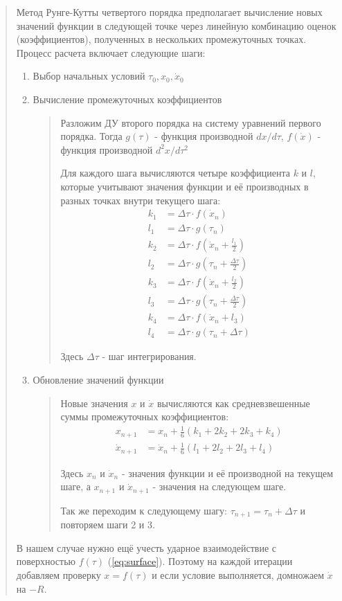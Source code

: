 \begin{quotation}
Метод Рунге-Кутты четвертого порядка предполагает вычисление новых значений функции в следующей точке через линейную комбинацию оценок (коэффициентов), полученных в нескольких промежуточных точках. Процесс расчета включает следующие шаги:

\begin{enumerate}
\item \label{initial_conditions}Выбор начальных условий $\tau_0, x_0, \dot x_0$
\item \label{intermediate_coefficients}Вычисление промежуточных коэффициентов
\begin{quotation}
Разложим ДУ второго порядка на систему уравнений первого порядка. Тогда $g(\tau)$ - функция производной $dx/d\tau$, \quad $f(\dot x)$ - функция производной $d^2x/d\tau^2$

Для каждого шага вычисляются четыре коэффициента \( k \) и \( l \), которые учитывают значения функции и её производных в разных точках внутри текущего шага:
\begin{align*}
k_1 &= \Delta \tau \cdot f(\dot x_n) \\
l_1 &= \Delta \tau \cdot g(\tau_n) \\
k_2 &= \Delta \tau \cdot f(\dot x_n + \frac{l_1}{2}) \\
l_2 &= \Delta \tau \cdot g(\tau_n + \frac{\Delta \tau }{2}) \\
k_3 &= \Delta \tau \cdot f(\dot x_n + \frac{l_2}{2}) \\
l_3 &= \Delta \tau \cdot g(\tau_n + \frac{\Delta \tau }{2}) \\
k_4 &= \Delta \tau \cdot f(\dot x_n + l_3) \\
l_4 &= \Delta \tau \cdot g(\tau_n + \Delta \tau)
\end{align*}

Здесь \(\Delta \tau\) - шаг интегрирования.
\end{quotation}

\item Обновление значений функции

\begin{quotation}
Новые значения \( x \) и \( \dot x \) вычисляются как средневзвешенные суммы промежуточных коэффициентов:
\begin{align*}
x_{n+1} &= x_n + \frac{1}{6} (k_1 + 2k_2 + 2k_3 + k_4) \\
\dot x_{n+1} &= \dot x_n + \frac{1}{6} (l_1 + 2l_2 + 2l_3 + l_4)
\end{align*}

Здесь \( x_n \) и \( \dot x_n \) - значения функции и её производной на текущем шаге, а \( x_{n+1} \) и \( \dot x_{n+1} \) - значения на следующем шаге.

Так же переходим к следующему шагу: $\tau_{n + 1} = \tau_n + \Delta \tau$ и повторяем шаги 2 и 3.
\end{quotation}
\end{enumerate}

В нашем случае нужно ещё учесть ударное взаимодействие с поверхностью $f(\tau)$ (\ref{eq:surface}). Поэтому на каждой итерации добавляем проверку $x = f(\tau)$ и если условие выполняется, домножаем \( \dot x \) на $-R$.
\end{quotation}